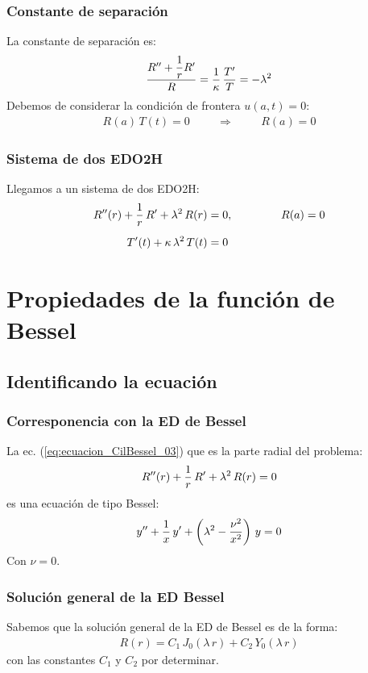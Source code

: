 \documentclass[12pt]{beamer}
\begin{document}
\begin{frame}
\frametitle{Constante de separación}
La constante de separación es:
\pause
\begin{align*}
\dfrac{{R}^{\prime \prime} + \dfrac{1}{r} {R}^{\prime}}{R} = \dfrac{1}{\kappa} \, \dfrac{{T}^{\prime}}{T} = -\lambda^{2}
\end{align*}
\pause
Debemos de considerar la condición de frontera $u(a, t) = 0$:
\pause
\begin{align*}
R(a) \, T(t) = 0 \hspace{1cm} \Rightarrow \hspace{1cm} R(a) = 0
\end{align*}
\end{frame}
\begin{frame}
\frametitle{Sistema de dos EDO2H}
Llegamos a un sistema de dos EDO2H:
\pause
\begin{align}
{R}^{\prime \prime}(r) + \dfrac{1}{r} \, {R}^{\prime} + \lambda^{2} \, R(r) &= 0, \hspace{1.5cm} R(a) = 0 \label{eq:ecuacion_CilBessel_03} \\[0.5em]
{T}^{\prime}(t) + \kappa \, \lambda^{2} \, T(t) &= 0 \label{eq:ecuacion_CilBessel_04}
\end{align}
\end{frame}

\section{Propiedades de la función de Bessel}
\subsection{Identificando la ecuación}

\begin{frame}
\frametitle{Corresponencia con la ED de Bessel}
La ec. (\ref{eq:ecuacion_CilBessel_03}) que es la parte radial del problema:
\pause
\begin{align*}
{R}^{\prime \prime}(r) + \dfrac{1}{r} \, {R}^{\prime} + \lambda^{2} \, R(r) = 0
\end{align*}
\pause
es una ecuación de tipo Bessel:
\pause
\begin{align*}
{y}^{\prime \prime} + \dfrac{1}{x} \, {y}^{\prime} + \left( \lambda^{2} - \dfrac{\nu^{2}}{x^{2}} \right) \, y = 0
\end{align*}
\pause
Con $\nu = 0$.
\end{frame}
\begin{frame}
\frametitle{Solución general de la ED Bessel}
Sabemos que la solución general de la ED de Bessel es de la forma:
\pause
\begin{align*}
R(r) = C_{1} \, J_{0} (\lambda \, r) + C_{2} \, Y_{0} (\lambda \, r)
\end{align*}
con las constantes $C_{1}$ y $C_{2}$ por determinar.
\end{frame}
\end{document}

